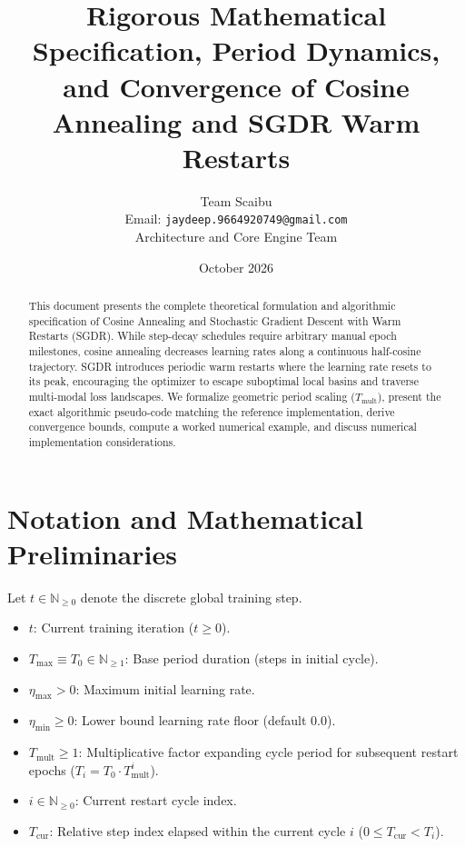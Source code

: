 \documentclass[11pt,a4paper]{article}
\title{\textbf{Rigorous Mathematical Specification, Period Dynamics, and Convergence of Cosine Annealing and SGDR Warm Restarts}}
\author{Team Scaibu \\ \small Email: \texttt{jaydeep.9664920749@gmail.com} \\ \small Architecture and Core Engine Team}
\date{October 2026}
\theoremstyle{definition}
\begin{document}
\maketitle

\begin{abstract}
This document presents the complete theoretical formulation and algorithmic specification of Cosine Annealing and Stochastic Gradient Descent with Warm Restarts (SGDR). While step-decay schedules require arbitrary manual epoch milestones, cosine annealing decreases learning rates along a continuous half-cosine trajectory. SGDR introduces periodic warm restarts where the learning rate resets to its peak, encouraging the optimizer to escape suboptimal local basins and traverse multi-modal loss landscapes. We formalize geometric period scaling ($T_{\text{mult}}$), present the exact algorithmic pseudo-code matching the reference implementation, derive convergence bounds, compute a worked numerical example, and discuss numerical implementation considerations.
\end{abstract}

\section{Notation and Mathematical Preliminaries}

Let $t \in \mathbb{N}_{\ge 0}$ denote the discrete global training step.

\begin{itemize}
    \item $t$: Current training iteration ($t \ge 0$).
    \item $T_{\text{max}} \equiv T_0 \in \mathbb{N}_{\ge 1}$: Base period duration (steps in initial cycle).
    \item $\eta_{\max} > 0$: Maximum initial learning rate.
    \item $\eta_{\min} \ge 0$: Lower bound learning rate floor (default $0.0$).
    \item $T_{\text{mult}} \ge 1$: Multiplicative factor expanding cycle period for subsequent restart epochs ($T_i = T_0 \cdot T_{\text{mult}}^i$).
    \item $i \in \mathbb{N}_{\ge 0}$: Current restart cycle index.
    \item $T_{\text{cur}}$: Relative step index elapsed within the current cycle $i$ ($0 \le T_{\text{cur}} < T_i$).
\end{itemize}
\end{document}
